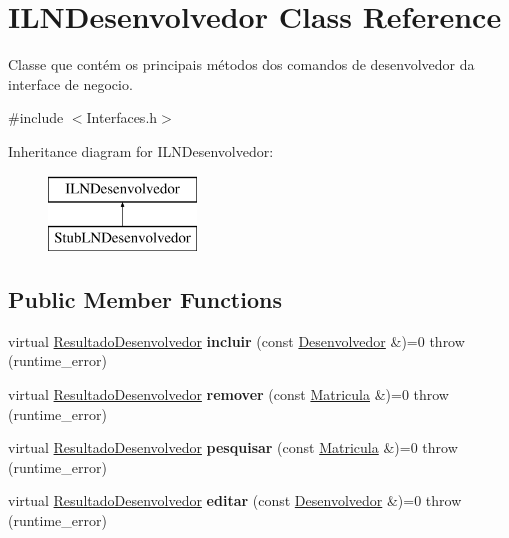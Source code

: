 \hypertarget{class_i_l_n_desenvolvedor}{}\section{I\+L\+N\+Desenvolvedor Class Reference}
\label{class_i_l_n_desenvolvedor}


Classe que contém os principais métodos dos comandos de desenvolvedor da interface de negocio.  




{\ttfamily \#include $<$Interfaces.\+h$>$}

Inheritance diagram for I\+L\+N\+Desenvolvedor\+:\begin{figure}[H]
\begin{center}
\leavevmode
\includegraphics[height=2.000000cm]{class_i_l_n_desenvolvedor}
\end{center}
\end{figure}
\subsection*{Public Member Functions}
\begin{DoxyCompactItemize}
\item 
\hypertarget{class_i_l_n_desenvolvedor_a336a4fd765096259da80e8c92a89b7bb}{}\label{class_i_l_n_desenvolvedor_a336a4fd765096259da80e8c92a89b7bb} 
virtual \hyperlink{class_resultado_desenvolvedor}{Resultado\+Desenvolvedor} {\bfseries incluir} (const \hyperlink{class_desenvolvedor}{Desenvolvedor} \&)=0  throw (runtime\+\_\+error)
\item 
\hypertarget{class_i_l_n_desenvolvedor_abc06df16cebd8e870bc3cdc99a315427}{}\label{class_i_l_n_desenvolvedor_abc06df16cebd8e870bc3cdc99a315427} 
virtual \hyperlink{class_resultado_desenvolvedor}{Resultado\+Desenvolvedor} {\bfseries remover} (const \hyperlink{class_matricula}{Matricula} \&)=0  throw (runtime\+\_\+error)
\item 
\hypertarget{class_i_l_n_desenvolvedor_aa53b2f33420e8747b6c01e938aa3a6c6}{}\label{class_i_l_n_desenvolvedor_aa53b2f33420e8747b6c01e938aa3a6c6} 
virtual \hyperlink{class_resultado_desenvolvedor}{Resultado\+Desenvolvedor} {\bfseries pesquisar} (const \hyperlink{class_matricula}{Matricula} \&)=0  throw (runtime\+\_\+error)
\item 
\hypertarget{class_i_l_n_desenvolvedor_aeb0d5d1e8a46d3d739b5059eb9978868}{}\label{class_i_l_n_desenvolvedor_aeb0d5d1e8a46d3d739b5059eb9978868} 
virtual \hyperlink{class_resultado_desenvolvedor}{Resultado\+Desenvolvedor} {\bfseries editar} (const \hyperlink{class_desenvolvedor}{Desenvolvedor} \&)=0  throw (runtime\+\_\+error)
\end{DoxyCompactItemize}


